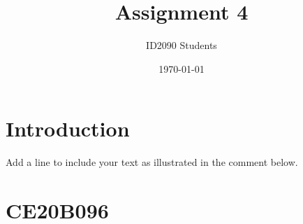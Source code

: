 \documentclass[a4paper, 12pt]{article}
\begin{document}
\title{Assignment 4}
\author{ID2090 Students}
\date{\today}
\maketitle

\tableofcontents

\section{Introduction}
Add a line to include your text as illustrated in the comment below.

% 
\section{CE20B096}

\end{document}
